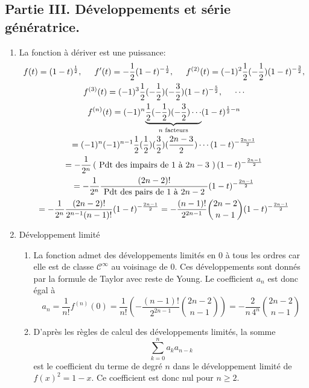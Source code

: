 \subsection*{Partie III. Développements et série génératrice.}
\begin{enumerate}
  \item La fonction à dériver est une puissance:
\begin{multline*}
f(t) = (1-t)^{\frac{1}{2}}, \hspace{0.5cm}
f'(t) = -\frac{1}{2}(1-t)^{-\frac{1}{2}} , \hspace{0.5cm}
f^{(2)}(t) = (-1)^2 \frac{1}{2} (-\frac{1}{2}) (1-t)^{-\frac{3}{2}}, \\
f^{(3)}(t) = (-1)^3 \frac{1}{2} (-\frac{1}{2}) (-\frac{3}{2}) (1-t)^{-\frac{5}{2}},\hspace{0.5cm}
\cdots \\
f^{(n)}(t) = (-1)^n
\underset{n \text{ facteurs} }{\underbrace{\frac{1}{2} (-\frac{1}{2}) (-\frac{3}{2}) \cdots  }}(1-t)^{\frac{1}{2}-n} \\
= (-1)^n (-1)^{n-1} \frac{1}{2} (\frac{1}{2}) (\frac{3}{2}) (\frac{2n-3}{2})\cdots (1-t)^{-\frac{2n-1}{2}}\\
=-\frac{1}{2^n}\left( \text{ Pdt des impairs de $1$ à $2n-3$ }\right)  (1-t)^{-\frac{2n-1}{2}}\\
= -\frac{1}{2^n} \frac{(2n-2)!}{\text{ Pdt des pairs de $1$ à $2n-2$ }} (1-t)^{-\frac{2n-1}{2}}\\
= -\frac{1}{2^n} \frac{(2n-2)!}{2^{n-1}(n-1)!} (1-t)^{-\frac{2n-1}{2}}
= -\frac{(n-1)!}{2^{2n-1}}\binom{2n-2}{n-1} (1-t)^{-\frac{2n-1}{2}}
\end{multline*}

  
  \item Développement limité
\begin{enumerate}
  \item La fonction admet des développements limités en $0$ à tous les ordres car elle est de classe $\mathcal{C}^\infty$ au voisinage de $0$. Ces développements sont donnés par la formule de Taylor avec reste de Young. Le coefficient $a_n$ est donc égal à
\begin{displaymath}
a_n = \frac{1}{n!}f^{(n)}(0)
= \frac{1}{n!} \left( -\frac{(n-1)!}{2^{2n-1}}\binom{2n-2}{n-1}\right) 
= -\frac{2}{n\, 4^{n}}\binom{2n-2}{n-1}
\end{displaymath}

  \item D'après les règles de calcul des développements limités, la somme 
\begin{displaymath}
  \sum_{k=0}^n a_ka_{n-k}
\end{displaymath}
est le coefficient du terme de degré $n$ dans le développement limité de $f(x)^2 = 1-x$. Ce coefficient est donc nul pour $n\geq 2$.
\end{enumerate}


\end{enumerate}
